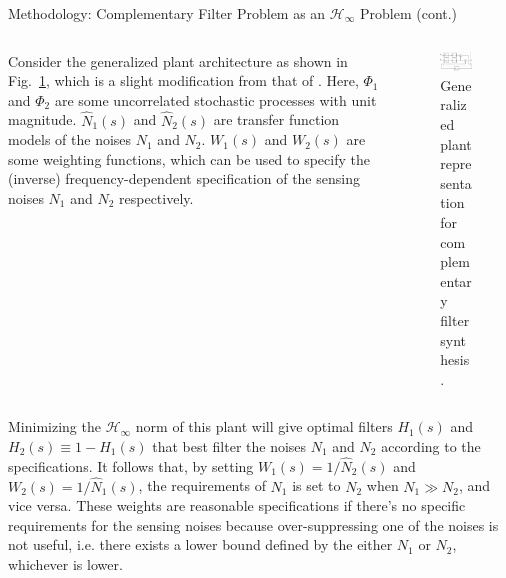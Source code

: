\documentclass{beamer}
\begin{document}
\begin{frame}[t]
\begin{columns}[t]
\begin{column}{0.32\linewidth}
\begin{block}{Methodology: Complementary Filter Problem as an $\mathcal{H}_\infty$ Problem (cont.)}
			\medskip
			
			\begin{columns}[t, onlytextwidth]
				\begin{column}{0.45\textwidth}
					Consider the generalized plant architecture as shown in Fig.~\ref{fig:generlized_plant_complementary_filter}, which is a slight modification from that of \cite{Thomas:2019}.
					Here, $\Phi_1$ and $\Phi_2$ are some uncorrelated stochastic processes with unit magnitude.
					$\hat{N}_1(s)$ and $\hat{N}_2(s)$ are transfer function models of the noises $N_1$ and $N_2$.
					$W_1(s)$ and $W_2(s)$ are some weighting functions, which can be used to specify the (inverse) frequency-dependent specification of the sensing noises $N_1$ and $N_2$ respectively.
				\end{column}
				\begin{column}{0.5\textwidth}
					\begin{figure}[!h]
						\centering
						\includegraphics[width=1\linewidth]{generalized_plant_complementary_filter}
						\caption{Generalized plant representation for complementary filter synthesis.}
						\label{fig:generlized_plant_complementary_filter}
					\end{figure}
				\end{column}
			\end{columns}
		
			\medskip
			
			Minimizing the $\mathcal{H}_\infty$ norm of this plant will give optimal filters $H_1(s)$ and $H_2(s)\equiv 1-H_1(s)$ that best filter the noises $N_1$ and $N_2$ according to the specifications.
			It follows that, by setting $W_1(s)=1/\hat{N}_2(s)$ and $W_2(s)=1/\hat{N}_1(s)$, the requirements of $N_1$ is set to $N_2$ when $N_1\gg N_2$, and vice versa.
			These weights are reasonable specifications if there's no specific requirements for the sensing noises because over-suppressing one of the noises is not useful, i.e. there exists a lower bound defined by the either $N_1$ or $N_2$, whichever is lower.
			

\end{block}
\end{column}
\end{columns}
\end{frame}
\end{document}
